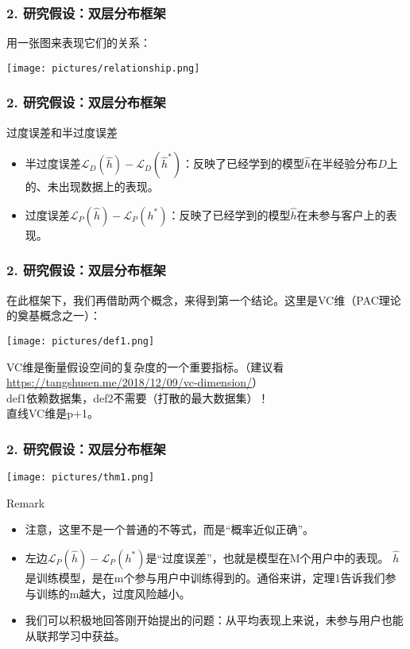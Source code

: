 \documentclass{beamer}
\begin{document}
\begin{frame}
    \frametitle{2. 研究假设：双层分布框架}
    用一张图来表现它们的关系：
    \begin{center}
        \texttt{[image: pictures/relationship.png]}
    \end{center}
\end{frame}
\begin{frame}
    \frametitle{2. 研究假设：双层分布框架}
    \begin{alertblock}{过度误差和半过度误差}
        \begin{itemize}
            \item 半过度误差$\mathcal{L}_{D}(\hat{h})-\mathcal{L}_{D}(\hat{h}^{*})$：反映了已经学到的模型$\hat{h}$在半经验分布$D$上的、未出现数据上的表现。
            \item 过度误差$\mathcal{L}_{P}(\hat{h})-\mathcal{L}_{P}(h^{*})$：反映了已经学到的模型$\hat{h}$在未参与客户上的表现。
        \end{itemize}
    \end{alertblock}
\end{frame}
\begin{frame}
    \frametitle{2. 研究假设：双层分布框架}
    在此框架下，我们再借助两个概念，来得到第一个结论。这里是VC维（PAC理论的奠基概念之一）：
    \begin{definition}
        \begin{center}
            \texttt{[image: pictures/def1.png]}
        \end{center}
    \end{definition}
    VC维是衡量假设空间的复杂度的一个重要指标。（建议看\url{https://tangshusen.me/2018/12/09/vc-dimension/}）\\
    def1依赖数据集，def2不需要（打散的最大数据集）！\\
    直线VC维是p+1。

\end{frame}
\begin{frame}
    \frametitle{2. 研究假设：双层分布框架}
    \texttt{[image: pictures/thm1.png]}
    \pause
    \begin{alertblock}{Remark}
        \begin{itemize}
            \item 注意，这里不是一个普通的不等式，而是“概率近似正确”。
            \item 左边$\mathcal{L}_{P}(\hat{h})-\mathcal{L}_{P}(h^{*})$是“过度误差”，也就是模型在M个用户中的表现。
            $\hat{h}$是训练模型，是在m个参与用户中训练得到的。通俗来讲，定理1告诉我们参与训练的m越大，过度风险越小。
            \item 我们可以积极地回答刚开始提出的问题：从平均表现上来说，未参与用户也能从联邦学习中获益。
        \end{itemize}
    \end{alertblock}
\end{frame}
\end{document}
